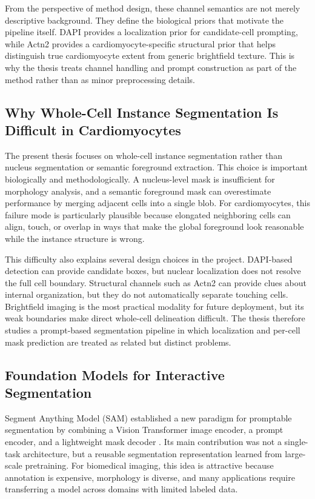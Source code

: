 From the perspective of method design, these channel semantics are not merely descriptive background. They define the biological priors that motivate the pipeline itself. DAPI provides a localization prior for candidate-cell prompting, while Actn2 provides a cardiomyocyte-specific structural prior that helps distinguish true cardiomyocyte extent from generic brightfield texture. This is why the thesis treats channel handling and prompt construction as part of the method rather than as minor preprocessing details.

\subsection{Why Whole-Cell Instance Segmentation Is Difficult in Cardiomyocytes}\label{why-whole-cell-instance-segmentation-is-difficult-in-cardiomyocytes}

The present thesis focuses on whole-cell instance segmentation rather than nucleus segmentation or semantic foreground extraction. This choice is important biologically and methodologically. A nucleus-level mask is insufficient for morphology analysis, and a semantic foreground mask can overestimate performance by merging adjacent cells into a single blob. For cardiomyocytes, this failure mode is particularly plausible because elongated neighboring cells can align, touch, or overlap in ways that make the global foreground look reasonable while the instance structure is wrong.

This difficulty also explains several design choices in the project. DAPI-based detection can provide candidate boxes, but nuclear localization does not resolve the full cell boundary. Structural channels such as Actn2 can provide clues about internal organization, but they do not automatically separate touching cells. Brightfield imaging is the most practical modality for future deployment, but its weak boundaries make direct whole-cell delineation difficult. The thesis therefore studies a prompt-based segmentation pipeline in which localization and per-cell mask prediction are treated as related but distinct problems.

\subsection{Foundation Models for Interactive Segmentation}\label{foundation-models-for-interactive-segmentation}

Segment Anything Model (SAM) established a new paradigm for promptable segmentation by combining a Vision Transformer image encoder, a prompt encoder, and a lightweight mask decoder \cite{kirillov2023sam}. Its main contribution was not a single-task architecture, but a reusable segmentation representation learned from large-scale pretraining. For biomedical imaging, this idea is attractive because annotation is expensive, morphology is diverse, and many applications require transferring a model across domains with limited labeled data.

